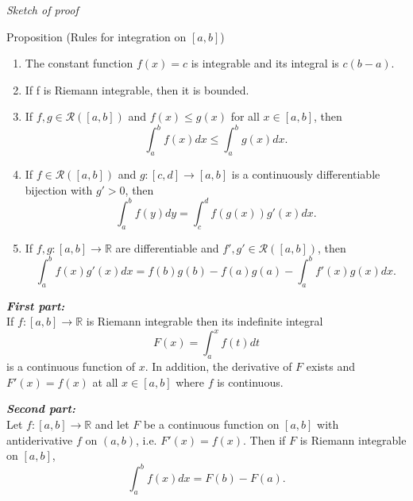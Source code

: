 \documentclass [aspectratio=169]{beamer}
\newcommand{\R}{{\mathbb{R}}}
\begin{document}
\begin{frame}
\textit{Sketch of proof}
\vspace{6cm}
\end{frame}



\begin{frame}
\begin{exampleblock}{Proposition (Rules for integration on $[a,b]$)}
\begin{enumerate}
    \item The constant function $f(x) = c$ is integrable and its integral is $c(b-a)$.
    \item If f is Riemann integrable, then it is bounded.
    \item If $f,g \in \mathcal{R}([a,b])$ and $f(x) \leq g(x)$ for all $x \in [a,b]$, then
    $$ \int_a^b f(x) dx \leq  \int_a^b g(x) dx.$$
    \item If $f \in \mathcal{R}([a,b])$ and $g:[c,d] \to [a,b]$ is a continuously differentiable bijection with $g'>0$, then 
     $$ \int_a^b f(y) dy =  \int_c^d f(g(x)) g'(x) dx.$$
     \item If $f,g : [a,b] \to \R$ are differentiable and $f',g' \in \mathcal{R}([a,b])$, then 
     $$ \int_a^b f(x) g'(x) dx =  f(b) g(b) - f(a) g(a) - \int_a^b f'(x) g(x) dx.$$
\end{enumerate}
\end{exampleblock}
\end{frame}

\begin{frame}
\begin{theorem}
\textbf{\emph{First part:}}\\
If $f:[a,b] \to \R$ is Riemann integrable then its indefinite integral
$$ F(x) = \int_a^x f(t) dt$$
is a continuous function of $x$. In addition, the derivative of $F$ exists and $F'(x) = f(x)$ at all $x \in [a,b]$ where $f$ is continuous.

\vspace{1em}

\textbf{\emph{Second part:}}\\
Let $f:[a,b]\to \R$ and let $F$ be a continuous function on $[a,b]$ with antiderivative $f$ on $(a,b)$, i.e. $F'(x) = f(x)$. Then if $F$ is Riemann integrable on $[a,b]$,
$$ \int_a^b f(x) dx = F(b) - F(a).$$
\end{theorem}

\end{frame}
\end{document}
